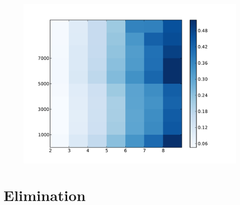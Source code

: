 \documentclass[11pt]{beamer}
\begin{document}
\begin{frame}[allowframebreaks]
\begin{figure}[h]
 \centering
 \includegraphics[width=1.0\textwidth]{./multiplication-by-omega.pdf}
\end{figure}

\end{frame}

\section{Elimination}
\end{document}
